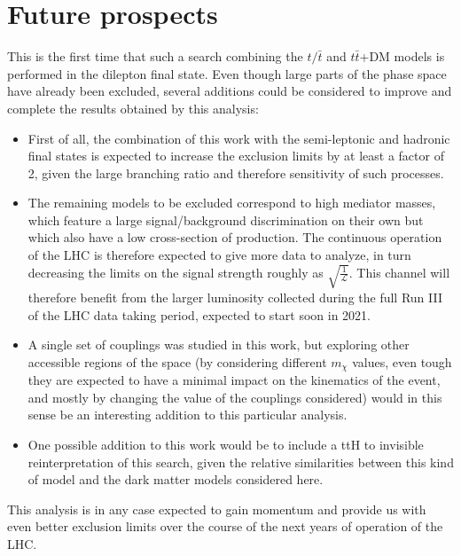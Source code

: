 \documentclass[a4paper, 10pt, openright]{report}
\begin{document}

\section{Future prospects}

This is the first time that such a search combining the $t/\bar t$ and $t \bar t$+DM models is performed in the dilepton final state. Even though large parts of the phase space have already been excluded, several additions could be considered to improve and complete the results obtained by this analysis:

\begin{itemize}
\item First of all, the combination of this work with the semi-leptonic and hadronic final states is expected to increase the exclusion limits by at least a factor of 2, given the large branching ratio and therefore sensitivity of such processes.
\item The remaining models to be excluded correspond to high mediator masses, which feature a large signal/background discrimination on their own but which also have a low cross-section of production. The continuous operation of the \ac{LHC} is therefore expected to give more data to analyze, in turn decreasing the limits on the signal strength roughly as $\sqrt{\frac{1}{\mathcal{L}}}$. This channel will therefore benefit from the larger luminosity collected during the full Run III of the LHC data taking period, expected to start soon in 2021.
\item A single set of couplings was studied in this work, but exploring other accessible regions of the space (by considering different $m_\chi$ values, even tough they are expected to have a minimal impact on the kinematics of the event, and mostly by changing the value of the couplings considered) would in this sense be an interesting addition to this particular analysis.
\item One possible addition to this work would be to include a ttH to invisible reinterpretation of this search, given the relative similarities between this kind of model and the dark matter models considered here. 
\end{itemize}

This analysis is in any case expected to gain momentum and provide us with even better exclusion limits over the course of the next years of operation of the \ac{LHC}.
\end{document}
